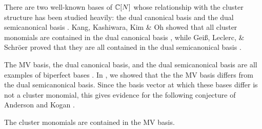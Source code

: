 \documentclass[draft]{article} %
\begin{document}
There are two well-known bases of $\mathbb C[N]$ whose relationship with the cluster structure has been studied heavily: the dual canonical basis \cite{lusztig1990canonicalbases} and the dual semicanonical basis \cite{lusztig2000semicanonical}.
Kang, Kashiwara, Kim \& Oh showed that all cluster monomials are contained in the dual canonical basis \cite{kang2018monoidal}, while Gei\ss, Leclerc, \& Schr\"oer proved that they are all contained in the dual semicanonical basis \cite[Theorem~2.8(3)]{geiss2006rigid}.
% 
% 
% 

The MV basis, the dual canonical basis, and the dual semicanonical basis are all examples of biperfect bases \cite{baumann2019mirkovic}.  In \cite[Appendix]{baumann2019mirkovic}, we showed that the the MV basis differs from the dual semicanonical basis.  Since the basis vector at which these bases differ is not a cluster monomial, this gives evidence for the following conjecture of Anderson and Kogan \cite[Conjecture 5.1]{anderson2006algebra}.
\begin{conjecture}\label{conj:cluster in MV}
    The cluster monomials are contained in the MV basis. 
\end{conjecture}
\end{document}
